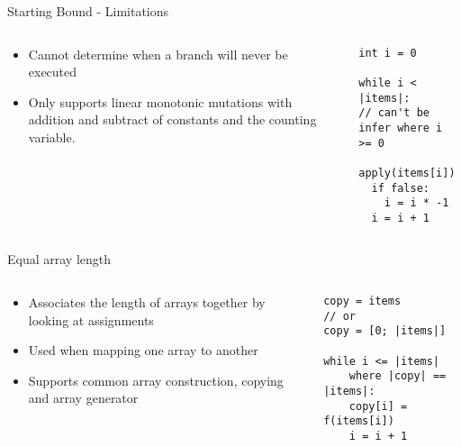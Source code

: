 \begin{frame}[fragile]{Starting Bound - Limitations}

\begin{columns}

\begin{column}{0.5\textwidth}
\begin{itemize}
    \item Cannot determine when a branch will never be executed
    \item Only supports linear monotonic mutations with addition and subtract
        of constants and the counting variable.
\end{itemize}
\end{column}

\begin{column}{0.5\textwidth}
\begin{verbatim}
int i = 0

while i < |items|:
// can't be infer where i >= 0
  apply(items[i])
  if false:
    i = i * -1
  i = i + 1
\end{verbatim}
\end{column}

\end{columns}

\end{frame}


\begin{frame}[fragile]{Equal array length}

\begin{columns}

\begin{column}{0.5\textwidth}
\begin{itemize}
    \item Associates the length of arrays together by looking at assignments
    \item Used when mapping one array to another
    \item Supports common array construction, copying and array generator
\end{itemize}
\end{column}

\begin{column}{0.5\textwidth}
\begin{verbatim}
copy = items
// or
copy = [0; |items|]

while i <= |items|
    where |copy| == |items|:
    copy[i] = f(items[i])
    i = i + 1
\end{verbatim}
\end{column}
\end{columns}

\end{frame}

